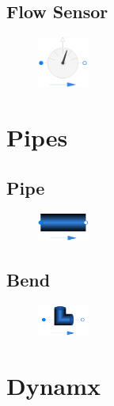 \documentclass[we,final,11pt,oneside,openany]{uantwerpenbamathesis}
\begin{document}
\subsection{Flow Sensor}
\label{subsec:flow-sensor}

\begin{figure}
    \centering
    \includegraphics[width=0.15\textwidth]{Images/components/flow-sensor}
\end{figure}

\lipsum[67]

\section{Pipes}
\label{sec:pipes}

\subsection{Pipe}
\label{subsec:pipe}

\begin{figure}
    \centering
    \includegraphics[width=0.15\textwidth]{Images/components/pipe}
\end{figure}

\lipsum[67]

\subsection{Bend}
\label{subsec:bend}

\begin{figure}
    \centering
    \includegraphics[width=0.15\textwidth]{Images/components/bend}
\end{figure}

\lipsum[67]

\section{Dynamx}
\label{sec:dynamx}
\end{document}
